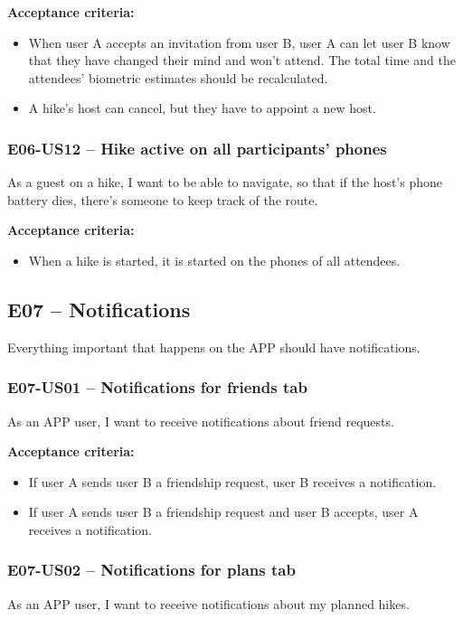 \textbf{Acceptance criteria:}
\begin{itemize}
    \item When user A accepts an invitation from user B, user A can let user B know that they have changed their mind and won't attend. The total time and the attendees' biometric estimates should be recalculated.
    \item A hike's host can cancel, but they have to appoint a new host.
\end{itemize}

\subsubsection*{E06-US12 -- Hike active on all participants' phones}
As a guest on a hike, I want to be able to navigate, so that if the host's phone battery dies, there's someone to keep track of the route.

\textbf{Acceptance criteria:}
\begin{itemize}
    \item When a hike is started, it is started on the phones of all attendees.
\end{itemize}

\subsection*{E07 -- Notifications}
Everything important that happens on the APP should have notifications.

\subsubsection*{E07-US01 -- Notifications for friends tab}
As an APP user, I want to receive notifications about friend requests.

\textbf{Acceptance criteria:}
\begin{itemize}
    \item If user A sends user B a friendship request, user B receives a notification.
    \item If user A sends user B a friendship request and user B accepts, user A receives a notification.
\end{itemize}

\subsubsection*{E07-US02 -- Notifications for plans tab}
As an APP user, I want to receive notifications about my planned hikes.

